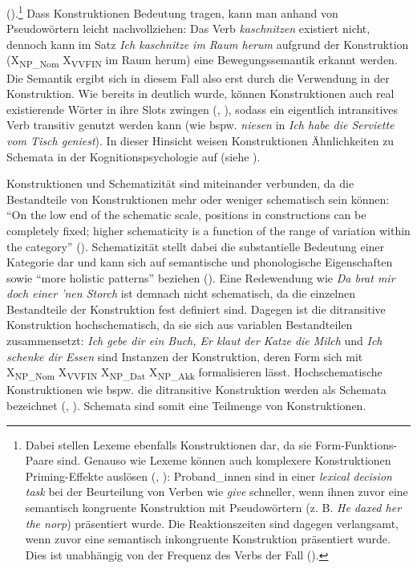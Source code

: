 (\cite[36]{Goldberg.2019}).\footnote{Dabei stellen Lexeme ebenfalls Konstruktionen dar, da sie Form-Funktions-Paare sind. Genauso wie Lexeme können auch komplexere Konstruktionen Priming-Effekte auslösen (\cite{Johnson.2013}, \cite[33]{Goldberg.2019}): Proband\_innen sind in einer \textit{lexical decision task} bei der Beurteilung von Verben wie \textit{give} schneller, wenn ihnen zuvor eine semantisch kongruente Konstruktion mit Pseudowörtern (z. B. \textit{He daxed her the norp}) präsentiert wurde. Die Reaktionszeiten sind dagegen verlangsamt, wenn zuvor eine semantisch inkongruente Konstruktion präsentiert wurde. Dies ist unabhängig von der Frequenz des Verbs der Fall (\cite[1447--1451]{Johnson.2013}).} Dass Konstruktionen Bedeutung tragen, kann man anhand von Pseudowörtern leicht nachvollziehen: Das Verb \textit{kaschnitzen} existiert nicht, dennoch kann im Satz \textit{Ich kaschnitze im Raum herum} aufgrund der Konstruktion (X\textsubscript{NP\_Nom} X\textsubscript{VVFIN} im Raum herum) eine Bewegungssemantik erkannt werden. Die Semantik ergibt sich in diesem Fall also erst durch die Verwendung in der Konstruktion. Wie bereits in  deutlich wurde, können Konstruktionen auch real existierende Wörter in ihre Slots zwingen (\cite[198]{Taylor.1998}, \cite[37]{Goldberg.2019}), sodass ein eigentlich intransitives Verb transitiv genutzt werden kann (wie bspw. \textit{niesen} in \textit{Ich habe die Serviette vom Tisch geniest}). In dieser Hinsicht weisen Konstruktionen Ähnlichkeiten zu Schemata in der Kognitionspsychologie auf (siehe ).

\begin{sloppypar}
Konstruktionen und Schematizität sind miteinander verbunden, da die Bestandteile von Konstruktionen mehr oder weniger schematisch sein können: "`On the low end of the schematic scale, positions in constructions can be completely fixed; higher schematicity is a function of the range of variation within the category"' (\cite[80]{Bybee.2010}). Schematizität stellt dabei die substantielle Bedeutung einer Kategorie dar und kann sich auf semantische und phonologische Eigenschaften sowie "`more holistic patterns"' beziehen (\cite[80]{Bybee.2010}). Eine Redewendung wie \textit{Da brat mir doch einer 'nen Storch} ist demnach nicht schematisch, da die einzelnen Bestandteile der Konstruktion fest definiert sind. Dagegen ist die ditransitive Konstruktion hochschematisch, da sie sich aus variablen Bestandteilen zusammensetzt: \textit{Ich gebe dir ein Buch, Er klaut der Katze die Milch} und \textit{Ich schenke dir Essen} sind Instanzen der Konstruktion, deren Form sich mit X\textsubscript{NP\_Nom} X\textsubscript{VVFIN} X\textsubscript{NP\_Dat} X\textsubscript{NP\_Akk} formalisieren lässt. Hochschematische Konstruktionen wie bspw. die ditransitive Konstruktion werden als Schemata bezeichnet (\cite[5]{Booij.2010}, \cite[80]{Bybee.2010}). Schemata sind somit eine Teilmenge von Konstruktionen.  
\end{sloppypar}


